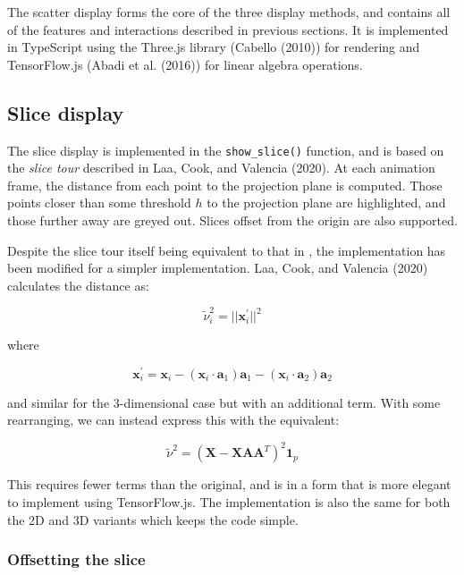 The scatter display forms the core of the three display methods, and contains all of the features and interactions described in previous sections. It is implemented in TypeScript using the Three.js library (Cabello (2010)) for rendering and TensorFlow.js (Abadi et al. (2016)) for linear algebra operations.

\hypertarget{slice-display}{%
\subsection{Slice display}\label{slice-display}}

The slice display is implemented in the \texttt{show\_slice()} function, and is based on the \emph{slice tour} described in Laa, Cook, and Valencia (2020). At each animation frame, the distance from each point to the projection plane is computed. Those points closer than some threshold \(h\) to the projection plane are highlighted, and those further away are greyed out. Slices offset from the origin are also supported.

Despite the slice tour itself being equivalent to that in , the implementation has been modified for a simpler implementation. Laa, Cook, and Valencia (2020) calculates the distance as:

\begin{equation}
\tilde \nu_i^2 = ||\mathbf{x}_i^\prime||^2
\label{eq:nu}
\end{equation}

where

\begin{equation}
\mathbf{x}_i^\prime = \mathbf{x}_i - 
  (\mathbf{x}_i \cdot \mathbf{a}_1)\mathbf{a}_1 - 
  (\mathbf{x}_i \cdot \mathbf{a}_2)\mathbf{a}_2
\label{eq:xprime}
\end{equation}

and similar for the 3-dimensional case but with an additional term. With some rearranging, we can instead express this with the equivalent:

\begin{equation}
\tilde \nu^2 = (\mathbf{X} - \mathbf{XAA}^T)^2 \mathbf{1}_p
\label{eq:nu2}
\end{equation}

This requires fewer terms than the original, and is in a form that is more elegant to implement using TensorFlow.js. The implementation is also the same for both the 2D and 3D variants which keeps the code simple.

\hypertarget{offsetting-the-slice}{%
\subsubsection{Offsetting the slice}\label{offsetting-the-slice}}

